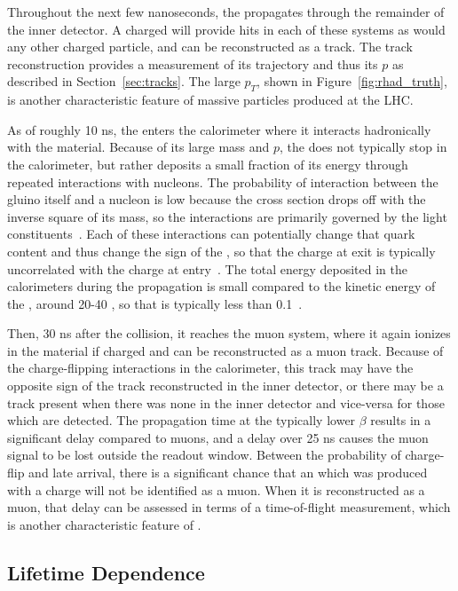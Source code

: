 Throughout the next few nanoseconds, the \rhadron propagates through the remainder of the inner detector.
A charged \rhadron will provide hits in each of these systems as would any other charged particle, and can be reconstructed as a track.
The track reconstruction provides a measurement of its trajectory and thus its $p$ as described in Section~\ref{sec:tracks}.
The large $p_T$, shown in Figure~\ref{fig:rhad_truth}, is another characteristic feature of massive particles produced at the \ac{LHC}.

As of roughly 10 ns, the \rhadron enters the calorimeter where it interacts hadronically with the material.
Because of its large mass and $p$, the \rhadron does not typically stop in the calorimeter, but rather deposits a small fraction of its energy through repeated interactions with nucleons.
The probability of interaction between the gluino itself and a nucleon is low because the cross section drops off with the inverse square of its mass, so the interactions are primarily governed by the light constituents~\cite{g4_rhad_2009}.
Each of these interactions can potentially change that quark content and thus change the sign of the \rhadron, so that the charge at exit is typically uncorrelated with the charge at entry~\cite{rhad_atlas}.
The total energy deposited in the calorimeters during the propagation is small compared to the kinetic energy of the \rhadron, around 20-40 \GeV, so that \ep is typically less than 0.1~\cite{rhad_atlas}.

Then, 30 ns after the collision, it reaches the muon system, where it again ionizes in the material if charged and can be reconstructed as a muon track.
Because of the charge-flipping interactions in the calorimeter, this track may have the opposite sign of the track reconstructed in the inner detector, or there may be a track present when there was none in the inner detector and vice-versa for those which are detected.
The propagation time at the typically lower $\beta$ results in a significant delay compared to muons, and a delay over 25 ns causes the muon signal to be lost outside the readout window.
Between the probability of charge-flip and late arrival, there is a significant chance that an \rhadron which was produced with a charge will not be identified as a muon.
When it is reconstructed as a muon, that delay can be assessed in terms of a time-of-flight measurement, which is another characteristic feature of \rhadrons.

\subsection{Lifetime Dependence}
\label{sec:rh_lifetimes}

